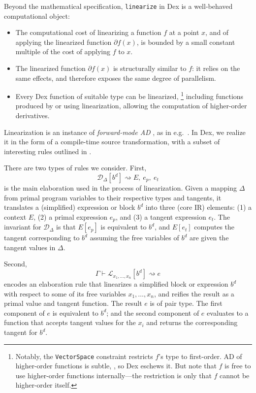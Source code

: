 \documentclass[acmsmall,screen,nonacm]{acmart}
\newcommand{\diffenv}{\Delta}
\newcommand{\linruleop}[2]{\mathcal{D}_{#1}[ #2 ] }
\newcommand{\linrule}[2]{\linruleop{#1}{#2} \rightsquigarrow }
\newcommand{\linreifyop}[3]{#1\vdash \mathcal{L}_{#2}[ #3 ] }
\newcommand{\linreify}[3]{\linreifyop{#1}{#2}{#3} \rightsquigarrow }
\newcommand{\linresult}[3]{#1,~#2,~#3}
\begin{document}
Beyond the mathematical specification, \texttt{linearize} in Dex is a well-behaved computational object:
\begin{itemize}
\item The computational cost of linearizing a function $f$ at a point $x$, and of applying the linearized function $\partial f(x)$, is bounded by a small constant multiple of the cost of applying $f$ to $x$.
\item The linearized function $\partial f(x)$ is structurally similar to $f$: it relies on the same effects, and therefore exposes the same degree of parallelism.
\item Every Dex function of suitable type can be linearized,%
\footnote{Notably, the \texttt{VectorSpace} constraint restricts $f$'s type to first-order.  AD of higher-order functions is subtle, \cite{manzyuk2019perturbationconfusion, ritchie2021higherorderad}, so Dex eschews it.  But note that $f$ is free to use higher-order functions internally---the restriction is only that $f$ cannot be higher-order itself.} %
including functions produced by or using linearization, allowing the computation of higher-order derivatives.
\end{itemize}
Linearization is an instance of \emph{forward-mode AD} \citep{griewank2008evaluating}, as in e.g.~\citet{elliott2018ad}.
In Dex, we realize it in the form of a compile-time source transformation, with a subset of interesting rules outlined in .

There are two types of rules we consider.  First,
$$\linrule{\diffenv}{b^d}\linresult{E}{e_p}{e_t}$$
is the main elaboration used in the process of linearization.
Given a mapping $\diffenv$ from primal program variables to their respective types and tangents, it translates a (simplified) expression or block $b^d$ into three (core IR) elements: (1) a context $E$, (2) a primal expression $e_p$, and (3) a tangent expression $e_t$.
The invariant for $\mathcal{D}_\diffenv$ is that $E[e_p]$ is equivalent to $b^d$, and $E[e_t]$ computes the tangent corresponding to $b^d$ assuming the free variables of $b^d$ are given the tangent values in $\Delta$.

Second,
$$\linreify{\Gamma}{x_1, \ldots, x_n}{b^d}e$$
encodes an elaboration rule that linearizes a simplified block or expression $b^d$ with respect to some of its free variables $x_1, \ldots, x_n$, and reifies the result as a primal value and tangent function.
The result $e$ is of pair type.
The first component of $e$ is equivalent to $b^d$; and the second component of $e$ evaluates to a function that accepts tangent values for the $x_i$ and returns the corresponding tangent for $b^d$.
\end{document}
